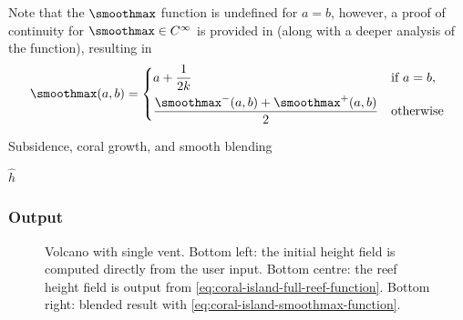 Note that the $\smoothmax$ function is undefined for $a = b$, however, a proof of continuity for $\smoothmax \in C^\infty$ is provided in  (along with a deeper analysis of the function), resulting in
\begin{align}
    \label{eq:coral-island-smoothmax-function}
    \smoothmax(a, b) = \begin{dcases}
        a + \frac{1}{2k} & \text{if } a = b, \\
        \frac{\smoothmax^-(a, b) + \smoothmax^+(a, b)}{2} & \text{otherwise}
    \end{dcases}
\end{align}

\begin{algorithm}[H]
    \caption{Subsidence, coral growth, and smooth blending}
    \label{alg:subsidence-coral-blend}
    \DontPrintSemicolon
    \BlankLine




    \Return $\hat{h}$
\end{algorithm}

\subsubsection{Output}
\label{sec:coral-island-procedural-output}

\begin{figure}
    \caption[Volcano with coral reef generated using our curve-based method]{Volcano with single vent. Bottom left: the initial height field is computed directly from the user input. Bottom centre: the reef height field is output from \cref{eq:coral-island-full-reef-function}. Bottom right: blended result with \cref{eq:coral-island-smoothmax-function}.}
    \label{fig:coral-island-volcano-example}
\end{figure}

